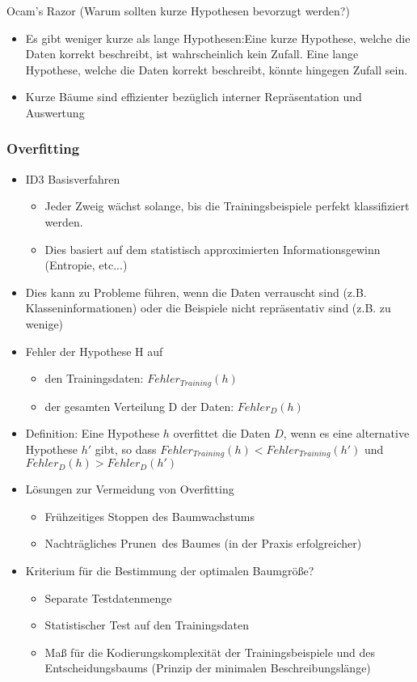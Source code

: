 \documentclass[paper=a4, fontsize=11pt]{scrartcl} %
\numberwithin{equation}{section} %
\numberwithin{figure}{section} %
\numberwithin{table}{section} %
\begin{document}
Ocam's Razor (Warum sollten kurze Hypothesen bevorzugt werden?)
\begin{itemize}
\item Es gibt weniger kurze als lange Hypothesen:Eine kurze Hypothese, welche die Daten korrekt beschreibt, ist wahrscheinlich kein Zufall. Eine lange Hypothese, welche die Daten korrekt beschreibt, könnte hingegen Zufall sein.
\item Kurze Bäume sind effizienter bezüglich interner Repräsentation und Auswertung
\end{itemize}

\subsubsection{Overfitting}

\begin{itemize}
\item ID3 Basisverfahren
\begin{itemize}
\item Jeder Zweig wächst solange, bis die Trainingsbeispiele perfekt klassifiziert werden.
\item Dies basiert auf dem statistisch approximierten Informationsgewinn (Entropie, etc...)
\end{itemize}
\item Dies kann zu Probleme führen, wenn die Daten verrauscht sind (z.B. Klasseninformationen) oder die Beispiele nicht repräsentativ sind (z.B. zu wenige)
\item Fehler der Hypothese H auf
\begin{itemize}
\item den Trainingsdaten: $Fehler_{Training}(h)$
\item der gesamten Verteilung D der Daten: $Fehler_D(h)$
\end{itemize}
\item Definition: Eine Hypothese $h$ overfittet die Daten $D$, wenn es eine alternative Hypothese $h'$ gibt, so dass $Fehler_{Training}(h) < Fehler_{Training}(h')$ und $Fehler_D(h) > Fehler_D(h')$
\item Lösungen zur Vermeidung von Overfitting
\begin{itemize}
\item Frühzeitiges Stoppen des Baumwachstums
\item Nachträgliches \glqq Prunen\grqq\ des Baumes (in der Praxis erfolgreicher)
\end{itemize}
\item Kriterium für die Bestimmung der optimalen Baumgröße?
\begin{itemize}
\item Separate Testdatenmenge
\item Statistischer Test auf den Trainingsdaten
\item Maß für die Kodierungskomplexität der Trainingsbeispiele und des Entscheidungsbaums (Prinzip der minimalen Beschreibungslänge)
\end{itemize}
\end{itemize}
\end{document}

